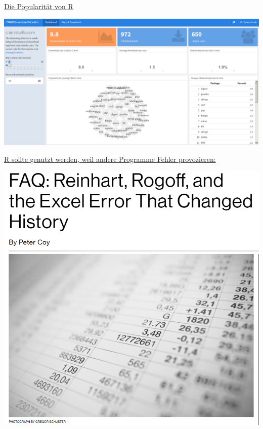 \documentclass[
  ignorenonframetext,
]{beamer}
\begin{document}
\begin{frame}{\href{https://gallery.shinyapps.io/cran-gauge/}{Die
Popularität von R}}
\protect\hypertarget{die-popularitat-von-r}{}

\includegraphics{figure/CRANdownloads.PNG}

\end{frame}

\begin{frame}{\href{https://www.bloomberg.com/news/articles/2013-04-18/faq-reinhart-rogoff-and-the-excel-error-that-changed-history}{R
sollte genutzt werden, weil andere Programme Fehler provozieren:}}
\protect\hypertarget{r-sollte-genutzt-werden-weil-andere-programme-fehler-provozieren}{}

\includegraphics{figure/RheinhartRogoff.PNG}

\end{frame}
\end{document}
